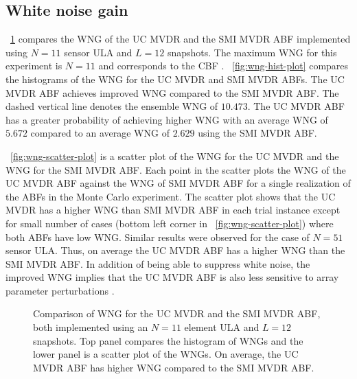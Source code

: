 \subsection{White noise gain}
\label{sec:ucmvdr-wng-result}
\figurename{}~\ref{fig:wng} compares the WNG of the UC MVDR and the
SMI MVDR ABF implemented using $N = 11$ sensor ULA and $L = 12$
snapshots. The maximum WNG for this experiment is $N = 11$ and
corresponds to the CBF
\cite{vtree2002oap}. \figurename{}~\ref{fig:wng-hist-plot} compares
the histograms of the WNG for the UC MVDR and SMI MVDR ABFs. The UC
MVDR ABF achieves improved WNG compared to the SMI MVDR ABF. The
dashed vertical line denotes the ensemble WNG of $10.473$. The UC MVDR
ABF has a greater probability of achieving higher WNG with an average
WNG of $5.672$ compared to an average WNG of $2.629$ using the SMI
MVDR ABF.

\figurename{}~\ref{fig:wng-scatter-plot} is a scatter plot of the WNG
for the UC MVDR and the WNG for the SMI MVDR ABF. Each point in the
scatter plots the WNG of the UC MVDR ABF against the WNG of SMI MVDR
ABF for a single realization of the ABFs in the Monte Carlo
experiment. The scatter plot shows that the UC MVDR has a higher WNG
than SMI MVDR ABF in each trial instance except for small number of
cases (bottom left corner in \figurename{}~\ref{fig:wng-scatter-plot})
where both ABFs have low WNG. Similar results were observed for the
case of $N = 51$ sensor ULA. Thus, on average the UC MVDR ABF has a
higher WNG than the SMI MVDR ABF. In addition of being able to
suppress white noise, the improved WNG implies that the UC MVDR ABF is
also less sensitive to array parameter perturbations
\cite{Gilbert1955,vtree2002oap}.


\begin{figure}[!hp]
  \centering

  \caption[Comparison of WNG for the UC MVDR and the SMI MVDR ABF,
    both implemented using an $N = 11$ element ULA and $L = 12$ snapshots.]{Comparison of WNG for the UC MVDR and the SMI MVDR ABF,
    both implemented using an $N = 11$ element ULA and $L = 12$
    snapshots. Top panel compares the histogram of WNGs and the lower
    panel is a scatter plot of the WNGs. On average, the UC MVDR ABF
    has higher WNG compared to the SMI MVDR ABF. }
  \label{fig:wng}
\end{figure}

